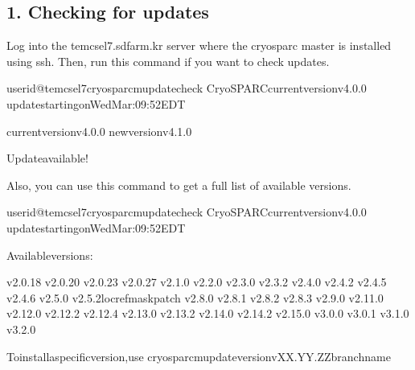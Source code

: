 \documentclass[a4paper,10pt,english]{sphinxmanual}
\begin{document}
\subsection{1. Checking for updates}
\label{\detokenize{faq:checking-for-updates}}
\sphinxAtStartPar
Log into the tem\sphinxhyphen{}cs\sphinxhyphen{}el7.sdfarm.kr server where the cryosparc master is installed using ssh. Then, run this command if you want to check updates.

\begin{sphinxVerbatim}[commandchars=\\\{\}]
userid@tem\PYGZhy{}cs\PYGZhy{}el7\PYGZdl{}\PYGZgt{}cryosparcmupdate\PYGZhy{}\PYGZhy{}check
CryoSPARCcurrentversionv4.0.0
updatestartingonWedMar:09:52EDT

currentversionv4.0.0
newversionv4.1.0

Updateavailable!
\end{sphinxVerbatim}

\sphinxAtStartPar
Also, you can use this command  to get a full list of available versions.

\begin{sphinxVerbatim}[commandchars=\\\{\}]
userid@tem\PYGZhy{}cs\PYGZhy{}el7\PYGZdl{}\PYGZgt{}cryosparcmupdate\PYGZhy{}\PYGZhy{}check
CryoSPARCcurrentversionv4.0.0
updatestartingonWedMar:09:52EDT

Availableversions:

v2.0.18
v2.0.20
v2.0.23
v2.0.27
v2.1.0
v2.2.0
v2.3.0
v2.3.2
v2.4.0
v2.4.2
v2.4.5
v2.4.6
v2.5.0
v2.5.2\PYGZhy{}locref\PYGZhy{}mask\PYGZhy{}patch
v2.8.0
v2.8.1
v2.8.2
v2.8.3
v2.9.0
v2.11.0
v2.12.0
v2.12.2
v2.12.4
v2.13.0
v2.13.2
v2.14.0
v2.14.2
v2.15.0
v3.0.0
v3.0.1
v3.1.0
v3.2.0

Toinstallaspecificversion,use
\PYGZdl{}cryosparcmupdate\PYGZhy{}\PYGZhy{}versionvXX.YY.ZZ\PYG{o}{[}\PYGZhy{}branchname\PYG{o}{]}
\end{sphinxVerbatim}
\end{document}
